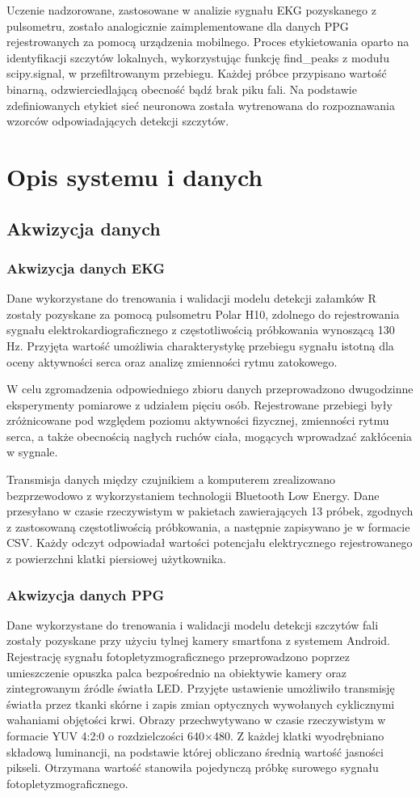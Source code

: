 \documentclass[journal]{IEEEtran}
\begin{document}
Uczenie nadzorowane, zastosowane w analizie sygnału EKG pozyskanego z pulsometru, zostało analogicznie zaimplementowane dla danych PPG rejestrowanych za pomocą urządzenia mobilnego. Proces etykietowania oparto na identyfikacji szczytów lokalnych, wykorzystując funkcję find\_peaks z modułu scipy.signal, w przefiltrowanym przebiegu. Każdej próbce przypisano wartość binarną, odzwierciedlającą obecność bądź brak piku fali. Na podstawie zdefiniowanych etykiet sieć neuronowa została wytrenowana do rozpoznawania wzorców odpowiadających detekcji szczytów.

\newpage
\section{Opis systemu i danych}
\subsection{Akwizycja danych}
\subsubsection{Akwizycja danych EKG}
Dane wykorzystane do trenowania i walidacji modelu detekcji załamków R zostały pozyskane za pomocą pulsometru Polar H10, zdolnego do rejestrowania sygnału elektrokardiograficznego z częstotliwością próbkowania wynoszącą 130 Hz. Przyjęta wartość umożliwia charakterystykę przebiegu sygnału istotną dla oceny aktywności serca oraz analizę zmienności rytmu zatokowego.

W celu zgromadzenia odpowiedniego zbioru danych przeprowadzono dwugodzinne eksperymenty pomiarowe z udziałem pięciu osób. Rejestrowane przebiegi były zróżnicowane pod względem poziomu aktywności fizycznej, zmienności rytmu serca, a także obecnością nagłych ruchów ciała, mogących wprowadzać zakłócenia w sygnale.

Transmisja danych między czujnikiem a komputerem zrealizowano bezprzewodowo z wykorzystaniem technologii Bluetooth Low Energy. Dane przesyłano w czasie rzeczywistym w pakietach zawierających 13 próbek, zgodnych z zastosowaną częstotliwością próbkowania, a następnie zapisywano je w formacie CSV. Każdy odczyt odpowiadał wartości potencjału elektrycznego rejestrowanego z powierzchni klatki piersiowej użytkownika.

\subsubsection{Akwizycja danych PPG}
Dane wykorzystane do trenowania i walidacji modelu detekcji szczytów fali zostały pozyskane przy użyciu tylnej kamery smartfona z systemem Android. Rejestrację sygnału fotopletyzmograficznego przeprowadzono poprzez umieszczenie opuszka palca bezpośrednio na obiektywie kamery oraz zintegrowanym źródle światła LED. Przyjęte ustawienie umożliwiło transmisję światła przez tkanki skórne i zapis zmian optycznych wywołanych cyklicznymi wahaniami objętości krwi. Obrazy przechwytywano w czasie rzeczywistym w formacie YUV 4:2:0 o rozdzielczości 640×480. Z każdej klatki wyodrębniano składową luminancji, na podstawie której obliczano średnią wartość jasności pikseli. Otrzymana wartość stanowiła pojedynczą próbkę surowego sygnału fotopletyzmograficznego.
\end{document}
